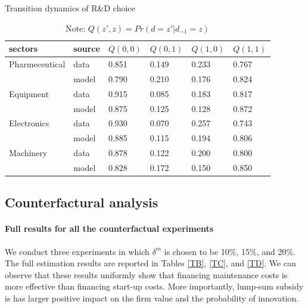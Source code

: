 \documentclass[English]{article}
\begin{document}
\begin{table}[H]
\centering
\caption{Transition dynamics of R\&D choice}
\label{T16}
\begin{tabular}{llllll}
\hline\hline
sectors      & source  &$Q(0,0)$  &$Q(0,1)$  &$Q(1,0)$ &$Q(1,1)$ \\
\hline
Pharmeceutical & data  & 0.851 & 0.149 & 0.233 & 0.767 \\
               & model & 0.790 & 0.210 & 0.176 & 0.824 \\
Equipment      & data  & 0.915 & 0.085 & 0.183 & 0.817 \\
               & model & 0.875 & 0.125 & 0.128 & 0.872 \\
Electronics    & data  & 0.930 & 0.070 & 0.257 & 0.743 \\
               & model & 0.885 & 0.115 & 0.194 & 0.806 \\
Machinery      & data  & 0.878 & 0.122 & 0.200 & 0.800 \\
               & model & 0.828 & 0.172 & 0.150 & 0.850 \\
\hline\hline
\end{tabular}
\caption*{\small{}Note: $Q(z',z)=Pr(d=z'|d_{-1}=z)$}{\small \par}
\end{table}

\subsection{Counterfactural analysis}

\paragraph{Full results for all the counterfactual experiments}\label{appc3}
We conduct three experiments in which $\delta^m$ is chosen to be 10\%, 15\%, and 20\%. The full estimation results are reported in Tables \ref{TB}, \ref{TC}, and \ref{TD}. We can observe that these results uniformly show that financing maintenance costs is more effective than financing start-up costs. More importantly, lump-sum subsidy is has larger positive impact on the firm value and the probability of innovation. 
\end{document}

